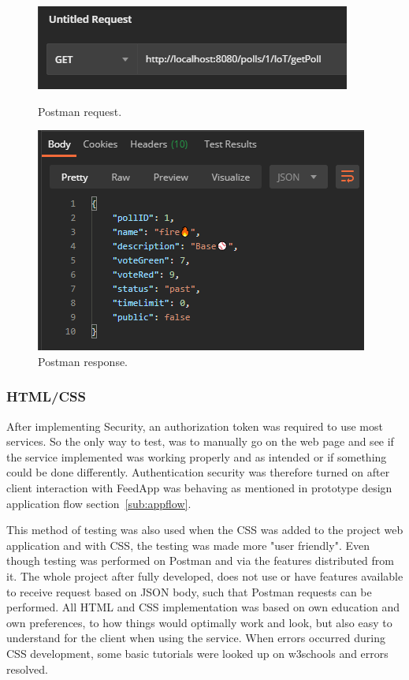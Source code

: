\begin{figure}[H]
  \centering
  \begin{minipage}{0.4\textwidth}
    \includegraphics[width=\textwidth]{figs/postmanrequest.png}
    \caption{Postman request.}
    \label{fig:postmanrequest}
  \end{minipage}
  \hfill
  \begin{minipage}{0.4\textwidth}
    \includegraphics[width=\textwidth]{figs/postmanresponse.png}
    \caption{Postman response.}
    \label{fig:postmanresponse}
  \end{minipage}
\end{figure}

\subsubsection{HTML/CSS}
After implementing Security, an authorization token was required to use most services. So the only way to test, was to manually go on the web page and see if the service implemented was working properly and as intended or if something could be done differently. Authentication security was therefore turned on after client interaction with FeedApp was behaving as mentioned in prototype design application flow section~\ref{sub:appflow}.

This method of testing was also used when the CSS was added to the project web application and with CSS, the testing was made more "user friendly". Even though testing was performed on Postman and via the features distributed from it. The whole project after fully developed, does not use or have features available to receive request based on JSON body, such that Postman requests can be performed. All HTML and CSS implementation was based on own education and own preferences, to how things would optimally work and look, but also easy to understand for the client when using the service. When errors occurred during CSS development, some basic tutorials were looked up on w3schools \cite{w3css} and errors resolved.

